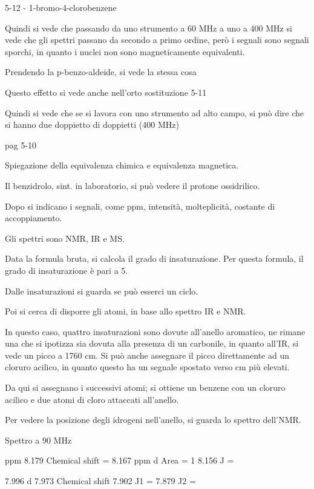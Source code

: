 5-12 - 1-bromo-4-clorobenzene

Quindi si vede che passando da uno strumento a 60 MHz a uno a 400 MHz si
vede che gli spettri passano da secondo a primo ordine, però i segnali
sono segnali sporchi, in quanto i nuclei non sono magneticamente
equivalenti.

Prendendo la p-benzo-aldeide, si vede la stessa cosa

Questo effetto si vede anche nell'orto sostituzione 5-11

Quindi si vede che se si lavora con uno strumento ad alto campo, si può
dire che si hanno due doppietto di doppietti (400 MHz)

pag 5-10

Spiegazione della equivalenza chimica e equivalenza magnetica.







Il benzidrolo, sint. in laboratorio, si può vedere il protone
ossidrilico.





Dopo si indicano i segnali, come ppm, intensità, molteplicità, costante
di accoppiamento.

Gli spettri sono NMR, IR e MS.

Data la formula bruta, si calcola il grado di insaturazione. Per questa
formula, il grado di insaturazione è pari a 5.

Dalle insaturazioni si guarda se può esserci un ciclo.

Poi si cerca di disporre gli atomi, in base allo spettro IR e NMR.

In questo caso, quattro insaturazioni sono dovute all'anello aromatico,
ne rimane una che si ipotizza sia dovuta alla presenza di un carbonile,
in quanto all'IR, si vede un picco a 1760 cm. Si può anche assegnare
il picco direttamente ad un cloruro acilico, in quanto questo ha un
segnale spostato verso cm più elevati.

Da qui si assegnano i successivi atomi; si ottiene un benzene con un
cloruro acilico e due atomi di cloro attaccati all'anello.

Per vedere la posizione degli idrogeni nell'anello, si guarda lo spettro
dell'NMR.

Spettro a 90 MHz

ppm 8.179 Chemical shift = 8.167 ppm d Area = 1 8.156 J =

7.996 d 7.973 Chemical shift 7.902 J1 = 7.879 J2 =

